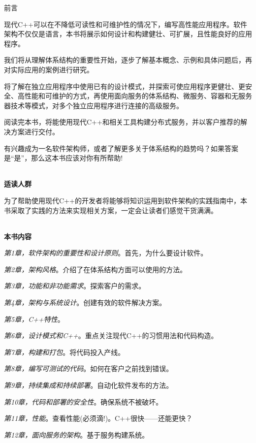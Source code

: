 \begin{flushright}
	 前言
\end{flushright}

现代C++可以在不降低可读性和可维护性的情况下，编写高性能应用程序。软件架构不仅仅是语言，本书将展示如何设计和构建健壮、可扩展，且性能良好的应用程序。

我们将从理解体系结构的重要性开始，逐步了解基本概念、示例和具体问题后，再对实际应用的案例进行研究。

将了解在独立应用程序中使用已有的设计模式，并探索可使应用程序更健壮、更安全、高性能和可维护的方式，再使用面向服务的体系结构、微服务、容器和无服务器技术等模式，对多个独立应用程序进行连接的高级服务。

阅读完本书，将能使用现代C++和相关工具构建分布式服务，并以客户推荐的解决方案进行交付。

有兴趣成为一名软件架构师，或者了解更多关于体系结构的趋势吗？如果答案是“是”，那么这本书应该对你有所帮助!


\hspace*{\fill} \\ %
\noindent\textbf{适读人群}

为了帮助使用现代C++的开发者将能够将知识运用到软件架构的实践指南中，本书采取了实践的方法来实现相关方案，一定会让读者们感觉干货满满。

\hspace*{\fill} \\ %
\textbf{本书内容}

\textit{第1章，软件架构的重要性和设计原则}。首先，为什么要设计软件。

\textit{第2章，架构风格}。介绍了在体系结构方面可以使用的方法。

\textit{第3章，功能和非功能需求}。探索客户的需求。

\textit{第4章，架构与系统设计}。创建有效的软件解决方案。

\textit{第5章，C++特性}。

\textit{第6章，设计模式和C++}。重点关注现代C++的习惯用法和代码构造。

\textit{第7章，构建和打包}。将代码投入产线。

\textit{第8章，编写可测试的代码}。如何在客户之前找到错误。

\textit{第9章，持续集成和持续部署}。自动化软件发布的方法。

\textit{第10章，代码和部署的安全性}。确保系统不被破坏。

\textit{第11章，性能}。查看性能(必须滴!)。C++很快——还能更快？

\textit{第12章，面向服务的架构}。基于服务构建系统。

